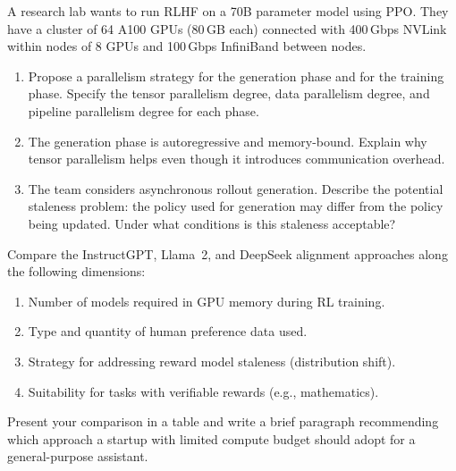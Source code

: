 \begin{exercise}
\label{ex:scaling-design}
A research lab wants to run RLHF on a 70B parameter model using PPO. They have a cluster of 64 A100 GPUs (80\,GB each) connected with 400\,Gbps NVLink within nodes of 8 GPUs and 100\,Gbps InfiniBand between nodes.
\begin{enumerate}
  \item Propose a parallelism strategy for the generation phase and for the training phase. Specify the tensor parallelism degree, data parallelism degree, and pipeline parallelism degree for each phase.
  \item The generation phase is autoregressive and memory-bound. Explain why tensor parallelism helps even though it introduces communication overhead.
  \item The team considers asynchronous rollout generation. Describe the potential staleness problem: the policy used for generation may differ from the policy being updated. Under what conditions is this staleness acceptable?
\end{enumerate}
\end{exercise}

\begin{exercise}
\label{ex:case-study-comparison}
Compare the InstructGPT, Llama~2, and DeepSeek alignment approaches along the following dimensions:
\begin{enumerate}
  \item Number of models required in GPU memory during RL training.
  \item Type and quantity of human preference data used.
  \item Strategy for addressing reward model staleness (distribution shift).
  \item Suitability for tasks with verifiable rewards (e.g., mathematics).
\end{enumerate}
Present your comparison in a table and write a brief paragraph recommending which approach a startup with limited compute budget should adopt for a general-purpose assistant.
\end{exercise}
